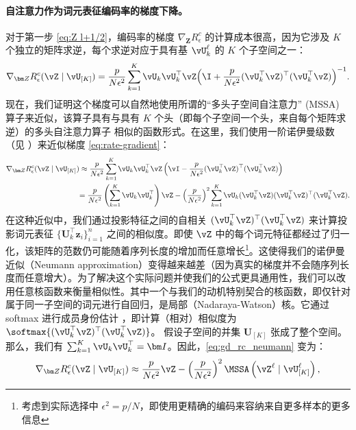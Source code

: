\documentclass[../../book-main_zh.tex]{subfiles}
\begin{document}
\paragraph{自注意力作为词元表征编码率的梯度下降。} 对于第一步 \eqref{eq:Z l+1/2}，编码率的梯度 \(\nabla_{\bm Z} R^c_\epsilon\) 的计算成本很高，因为它涉及 \(K\) 个独立的矩阵求逆，每个求逆对应于具有基 \(\vU_{k}^{\ell}\) 的 \(K\) 个子空间之一：
\begin{equation}
    \nabla_{\bm Z} R_{\epsilon}^c(\vZ \mid \vU_{[K]})
    = \frac{p}{N\epsilon^2}\sum_{k=1}^K \vU_k\vU_k^\top\vZ\Big(\I +
    \frac{p}{N\epsilon^2}(\vU_k^\top\vZ)^\top(\vU_k^\top\vZ)\Big)^{-1}.
    \label{eq:rate-gradient}
\end{equation}
现在，我们证明这个梯度可以自然地使用所谓的“多头子空间自注意力” (MSSA) 算子来近似，该算子具有与具有 \(K\) 个头（即每个子空间一个头，来自每个矩阵求逆）的多头自注意力算子 \citep{vaswani2017attention} 相似的函数形式。在这里，我们使用一阶诺伊曼级数（见 ）来近似梯度 \eqref{eq:rate-gradient}：
\begin{align}\label{eq:gd_rc_neumann}
    \nabla_{\bm Z} R_{\epsilon}^{c}(\vZ \mid \vU_{[K]})
    &\approx \frac{p}{N\epsilon^2} \sum_{k =
    1}^{K}\vU_{k}\vU_{k}^\top\vZ\left(\vI - \frac{p}{N\epsilon^2}
    (\vU_{k}^\top\vZ)^\top(\vU_{k}^\top\vZ)\right) \notag \\
    &{= \frac{p}{N\epsilon^2} \left(\sum_{k = 1}^{K}
        \vU_{k}\vU_{k}^\top\right)\vZ -  \left(
        \frac{p}{N\epsilon^2}\right)^2\sum_{k = 1}^{K}
    \vU_{k}(\vU_{k}^\top\vZ)(\vU_{k}^\top\vZ)^\top(\vU_{k}^\top\vZ)}.
\end{align}
在这种近似中，我们通过投影特征之间的自相关 $(\vU_{k}^\top\vZ)^\top(\vU_{k}^\top\vZ)$ 来计算投影词元表征 $\{\bm U_k^\top\bm z_i\}_{i = 1}^{n}$ 之间的相似度。即使 \(\vZ\) 中的每个词元特征都经过了归一化，该矩阵的范数仍可能随着序列长度的增加而任意增长\footnote{考虑到实际选择中 \(\epsilon^{2} = p/N\)，即使用更精确的编码来容纳来自更多样本的更多信息}。这使得我们的诺伊曼近似（Neumann approximation）变得越来越差（因为真实的梯度并不会随序列长度而任意增大）。为了解决这个实际问题并使我们的公式更具通用性，我们可以改用任意核函数来衡量相似性。其中一个与我们的动机特别契合的核函数，即仅针对属于同一子空间的词元进行自回归，是局部（Nadaraya-Watson）核。它通过 softmax 进行成员身份估计 \citep{chaudhari2021attentive}，即计算（相对）相似度为 $\softmax{(\vU_{k}^\top\vZ)^\top(\vU_{k}^\top\vZ)}$。
假设子空间的并集 $\bm U_{[K]}$ 张成了整个空间。那么，我们有 $\sum_{k = 1}^{K} \vU_{k}\vU_{k}^\top = \bm I$。因此，\eqref{eq:gd_rc_neumann} 变为：
\begin{align}\label{eq:grad Rc}
    \nabla_{\bm Z} R_{\epsilon}^{c}(\vZ \mid \vU_{[K]})
    \approx  \frac{p}{N\epsilon^2} \vZ -  \left(
    \frac{p}{N\epsilon^2}\right)^2 \MSSA\left(\vZ^{\ell} \mid
    \vU_{[K]}^{\ell}\right),
\end{align}
\end{document}
